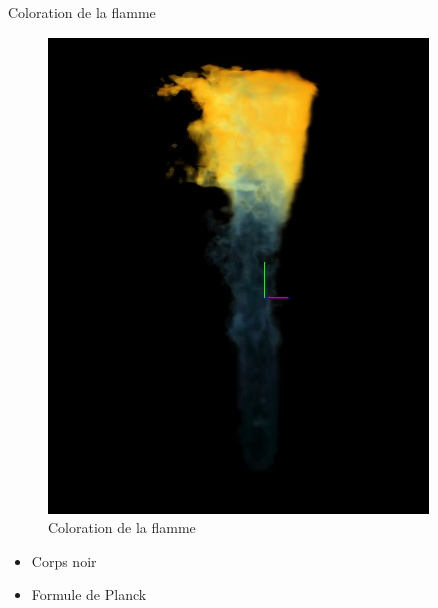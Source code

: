 \documentclass{beamer}
\begin{document}
\begin{frame}{Coloration de la flamme}

  \begin{minipage}{0.48\linewidth} 
    \begin{figure}[!h]
      \centering\includegraphics[scale=0.3]{FlammeBleue2.jpg}
      \caption{Coloration de la flamme}
      \label{PlanAffiche}
    \end{figure}
  \end{minipage}
  \begin{minipage}{0.48\linewidth}
  \begin{itemize}
  \item Corps noir
  \item Formule de Planck
  \end{itemize}
  \end{minipage}
\end{frame}
\end{document}
